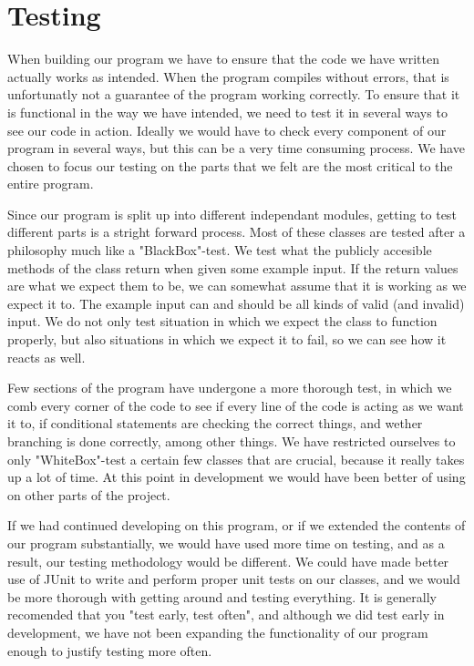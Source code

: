\documentclass[a4paper,10pt,titlepage]{article}
\begin{document}
		
	\newpage
	\section{Testing}
	When building our program we have to ensure that the code we have written actually works as intended. When the program compiles without errors, that is unfortunatly not a guarantee of the program working correctly. To ensure that it is functional in the way we have intended, we need to test it in several ways to see our code in action. Ideally we would have to check every component of our program in several ways, but this can be a very time consuming process. We have chosen to focus our testing on the parts that we felt are the most critical to the entire program.

Since our program is split up into different independant modules, getting to test different parts is a stright forward process. Most of these classes are tested after a philosophy much like a "BlackBox"-test. We test what the publicly accesible methods of the class return when given some example input. If the return values are what we expect them to be, we can somewhat assume that it is working as we expect it to. The example input can and should be all kinds of valid (and invalid) input. We do not only test situation in which we expect the class to function properly, but also situations in which we expect it to fail, so we can see how it reacts as well.

Few sections of the program have undergone a more thorough test, in which we comb every corner of the code to see if every line of the code is acting as we want it to, if conditional statements are checking the correct things, and wether branching is done correctly, among other things. We have restricted ourselves to only "WhiteBox"-test a certain few classes that are crucial, because it really takes up a lot of time. At this point in development we would have been better of using on other parts of the project.

If we had continued developing on this program, or if we extended the contents of our program substantially, we would have used more time on testing, and as a result, our testing methodology would be different. We could have made better use of JUnit to write and perform proper unit tests on our classes, and we would be more thorough with getting around and testing everything. It is generally recomended that you "test early, test often", and although we did test early in development, we have not been expanding the functionality of our program enough to justify testing more often. 
\end{document}
